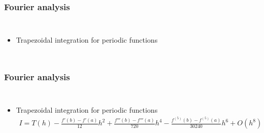 \documentclass[aspectratio=1610]{beamer}
\begin{document}
\begin{frame}
\frametitle{Fourier analysis}
\begin{columns}
\column{37em}
\begin{itemize}
	\item<1-> Trapezoidal integration for periodic functions
\end{itemize}

\end{columns}
\end{frame}
\begin{frame}
\frametitle{Fourier analysis}
\begin{columns}
\column{37em}
\begin{itemize}
	\item<1-> Trapezoidal integration for periodic functions\\
	 \begin{align*}I = T(h)-\frac{f'(b)-f'(a)}{12}h^2+\frac{f'''(b)-f'''(a)}{720}h^4-\frac{f^{(5)}(b)-f^{(5)}(a)}{30240}h^6+O(h^8)
			\end{align*}
\end{itemize}

\end{columns}
\end{frame}
\end{document}
